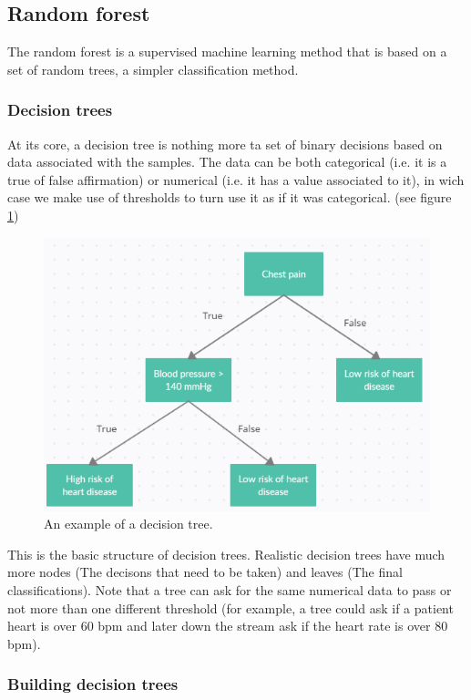 \documentclass[a4paper]{report}
\begin{document}
\subsection{Random forest}
The random forest is a supervised machine learning method that is based on a set of random trees, a simpler classification method.

\subsubsection{Decision trees}
 At its core, a decision tree is nothing more ta set of binary decisions based on data associated with the samples. The data can be both categorical (i.e. it is a true of false affirmation) or numerical (i.e. it has a value associated to it), in wich case we make use of thresholds to turn use it as if it was categorical. (see figure \ref{chestt})
 
\begin{figure} [H]
    \centering
    \includegraphics [width=12cm] {o/chestt.png}
    \caption{An example of a decision tree.}
    \label{chestt}
\end{figure}

This is the basic structure of decision trees. Realistic decision trees have much more nodes (The decisons that need to be taken) and leaves (The final classifications). Note that a tree can ask for the same numerical data to pass or not more than one different threshold (for example, a tree could ask if a patient heart is over 60 bpm and later down the stream ask if the heart rate is over 80 bpm).

\subsubsection{Building decision trees}
\end{document}
